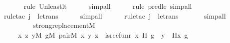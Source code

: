 \begin{isabellebody}
\ \ \ \ \ \isamarkupfalse%
{\isacharparenleft}{\kern0pt}rule\ Un{\isacharunderscore}{\kern0pt}least{\isacharunderscore}{\kern0pt}lt{\isacharparenright}{\kern0pt}{\isacharplus}{\kern0pt}\isanewline
\ \ \ \ \isamarkupfalse%
\ simp{\isacharunderscore}{\kern0pt}all\isanewline
\ \ \ \ \ \isamarkupfalse%
{\isacharparenleft}{\kern0pt}rule\ pred{\isacharunderscore}{\kern0pt}le{\isacharcomma}{\kern0pt}\ simp{\isacharunderscore}{\kern0pt}all{\isacharparenright}{\kern0pt}{\isacharplus}{\kern0pt}\isanewline
\ \ \ \ \ \isamarkupfalse%
{\isacharparenleft}{\kern0pt}rule{\isacharunderscore}{\kern0pt}tac\ j{\isacharequal}{\kern0pt}{}\ \ le{\isacharunderscore}{\kern0pt}trans{\isacharparenright}{\kern0pt}\isanewline
\ \ \ \ \isamarkupfalse%
\ simp{\isacharunderscore}{\kern0pt}all\isanewline
\ \ \ \ \ \isamarkupfalse%
{\isacharparenleft}{\kern0pt}rule{\isacharunderscore}{\kern0pt}tac\ j{\isacharequal}{\kern0pt}{}\ \ le{\isacharunderscore}{\kern0pt}trans{\isacharparenright}{\kern0pt}\isanewline
\ \ \ \ \ \isamarkupfalse%
\ simp{\isacharunderscore}{\kern0pt}all\isanewline
\ \ \ \ \isamarkupfalse%
\isanewline
\ \ \ \ \isanewline
\ \ \isamarkupfalse%
\ {\isachardoublequoteopen}strong{\isacharunderscore}{\kern0pt}replacement{\isacharparenleft}{\kern0pt}{\isacharhash}{\kern0pt}{\isacharhash}{\kern0pt}M{\isacharcomma}{\kern0pt}\ \isanewline
\ \ \ \ {\isasymlambda}x\ z{\isachardot}{\kern0pt}\ {\isasymexists}y{\isacharbrackleft}{\kern0pt}{\isacharhash}{\kern0pt}{\isacharhash}{\kern0pt}M{\isacharbrackright}{\kern0pt}{\isachardot}{\kern0pt}\ {\isasymexists}g{\isacharbrackleft}{\kern0pt}{\isacharhash}{\kern0pt}{\isacharhash}{\kern0pt}M{\isacharbrackright}{\kern0pt}{\isachardot}{\kern0pt}\ pair{\isacharparenleft}{\kern0pt}{\isacharhash}{\kern0pt}{\isacharhash}{\kern0pt}M{\isacharcomma}{\kern0pt}\ x{\isacharcomma}{\kern0pt}\ y{\isacharcomma}{\kern0pt}\ z{\isacharparenright}{\kern0pt}\ {\isasymand}\ is{\isacharunderscore}{\kern0pt}recfun{\isacharparenleft}{\kern0pt}r{\isacharcomma}{\kern0pt}\ x{\isacharcomma}{\kern0pt}\ H{\isacharcomma}{\kern0pt}\ g{\isacharparenright}{\kern0pt}\ {\isasymand}\ y\ {\isacharequal}{\kern0pt}\ H{\isacharparenleft}{\kern0pt}x{\isacharcomma}{\kern0pt}\ g{\isacharparenright}{\kern0pt}{\isacharparenright}{\kern0pt}{\isachardoublequoteclose}\isanewline
\ \ \ \ \isamarkupfalse%

\end{isabellebody}
